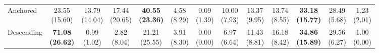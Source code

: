 {\begin{tabular}{l|cccccc|cccccc}
Anchored & \makecell{23.55 \\ (15.60)} & \makecell{13.79 \\ (14.04)} & \makecell{17.44 \\ (20.65)} & {\cellcolor[HTML]{C8E6C9}} \bfseries \makecell{40.55 \\ (23.36)} & \makecell{4.58 \\ (8.29)} & \makecell{0.09 \\ (1.39)} & \makecell{10.00 \\ (7.93)} & \makecell{13.37 \\ (9.95)} & \makecell{13.74 \\ (8.55)} & {\cellcolor[HTML]{C8E6C9}} \bfseries \makecell{33.18 \\ (15.77)} & \makecell{28.49 \\ (5.68)} & \makecell{1.23 \\ (2.01)} \\
Descending & \bfseries \makecell{71.08 \\ (26.62)} & \makecell{0.99 \\ (1.02)} & \makecell{2.82 \\ (8.04)} & {\cellcolor[HTML]{C8E6C9}} \makecell{21.21 \\ (25.55)} & \makecell{3.91 \\ (8.30)} & \makecell{0.00 \\ (0.00)} & \makecell{6.97 \\ (6.64)} & \makecell{11.43 \\ (8.81)} & \makecell{16.18 \\ (8.42)} & {\cellcolor[HTML]{C8E6C9}} \bfseries \makecell{34.86 \\ (15.89)} & \makecell{29.56 \\ (6.27)} & \makecell{1.00 \\ (0.00)} \\
\bottomrule
\end{tabular}
}%
